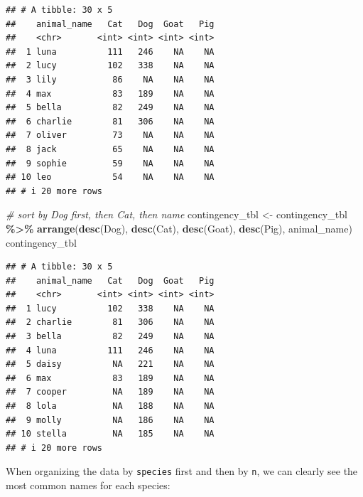 \documentclass[
]{article}
\newenvironment{Shaded}{\begin{snugshade}}{\end{snugshade}}
\newcommand{\CommentTok}[1]{\textcolor[rgb]{0.56,0.35,0.01}{\textit{#1}}}
\newcommand{\FunctionTok}[1]{\textcolor[rgb]{0.13,0.29,0.53}{\textbf{#1}}}
\newcommand{\NormalTok}[1]{#1}
\newcommand{\OtherTok}[1]{\textcolor[rgb]{0.56,0.35,0.01}{#1}}
\newcommand{\SpecialCharTok}[1]{\textcolor[rgb]{0.81,0.36,0.00}{\textbf{#1}}}
\begin{document}
\begin{verbatim}
## # A tibble: 30 x 5
##    animal_name   Cat   Dog  Goat   Pig
##    <chr>       <int> <int> <int> <int>
##  1 luna          111   246    NA    NA
##  2 lucy          102   338    NA    NA
##  3 lily           86    NA    NA    NA
##  4 max            83   189    NA    NA
##  5 bella          82   249    NA    NA
##  6 charlie        81   306    NA    NA
##  7 oliver         73    NA    NA    NA
##  8 jack           65    NA    NA    NA
##  9 sophie         59    NA    NA    NA
## 10 leo            54    NA    NA    NA
## # i 20 more rows
\end{verbatim}

\begin{Shaded}
\begin{Highlighting}[]
\CommentTok{\# sort by Dog first, then Cat, then name}
\NormalTok{contingency\_tbl }\OtherTok{\textless{}{-}}\NormalTok{ contingency\_tbl }\SpecialCharTok{\%\textgreater{}\%}
  \FunctionTok{arrange}\NormalTok{(}\FunctionTok{desc}\NormalTok{(Dog), }\FunctionTok{desc}\NormalTok{(Cat), }\FunctionTok{desc}\NormalTok{(Goat), }\FunctionTok{desc}\NormalTok{(Pig), animal\_name)}
\NormalTok{contingency\_tbl}
\end{Highlighting}
\end{Shaded}

\begin{verbatim}
## # A tibble: 30 x 5
##    animal_name   Cat   Dog  Goat   Pig
##    <chr>       <int> <int> <int> <int>
##  1 lucy          102   338    NA    NA
##  2 charlie        81   306    NA    NA
##  3 bella          82   249    NA    NA
##  4 luna          111   246    NA    NA
##  5 daisy          NA   221    NA    NA
##  6 max            83   189    NA    NA
##  7 cooper         NA   189    NA    NA
##  8 lola           NA   188    NA    NA
##  9 molly          NA   186    NA    NA
## 10 stella         NA   185    NA    NA
## # i 20 more rows
\end{verbatim}

When organizing the data by \texttt{species} first and then by
\texttt{n}, we can clearly see the most common names for each species:
\end{document}
